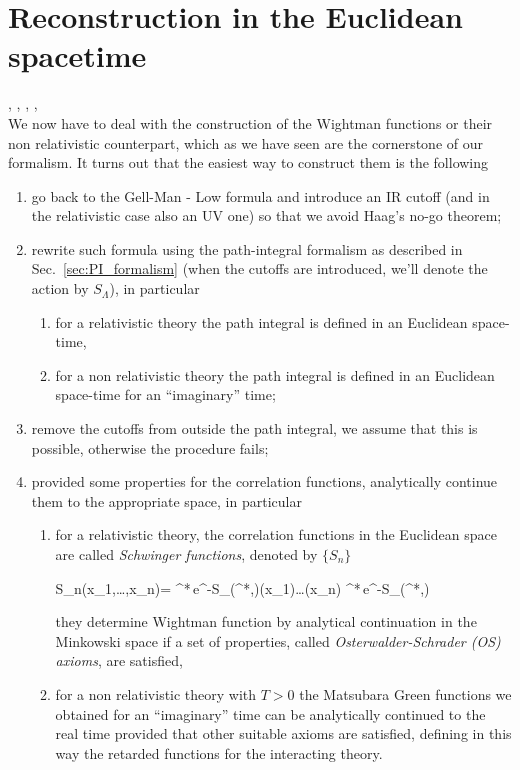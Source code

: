 \documentclass[../main/main.tex]{subfiles}
\begin{document}

\chapter{Reconstruction in the Euclidean spacetime}

\cite[Pages 185-191]{Streater:2000}, \cite{Summers:2016}, \cite{Wightman:1976}, \cite[Section 5.1]{Strocchi_2013}, \cite[Section 6.1, Chapter 19]{Glimm:1987}\\

We now have to deal with the construction of the Wightman functions or their non relativistic counterpart, which as we have seen are the cornerstone of our formalism. It turns out that the easiest way to construct them is the following
\begin{enumerate}[label=(\arabic*)]
	\item go back to the Gell-Man - Low formula and introduce an IR cutoff (and in the relativistic case also an UV one) so that we avoid Haag's no-go theorem;
	\item rewrite such formula using the path-integral formalism as described in Sec.~\ref{sec:PI_formalism} (when the cutoffs are introduced, we'll denote the action by $S_\Lambda$), in particular
	\begin{enumerate}[label=(\alph*)]
		\item for a relativistic theory the path integral is defined in an Euclidean space-time,
		\item for a non relativistic theory the path integral is defined in an Euclidean space-time for an ``imaginary'' time;
	\end{enumerate}
	\item remove the cutoffs from outside the path integral, we assume that this is possible, otherwise the procedure fails;
	\item provided some properties for the correlation functions, analytically continue them to the appropriate space, in particular
	\begin{enumerate}[label=(\alph*)]
		\item for a relativistic theory, the correlation functions in the Euclidean space are called \emph{Schwinger functions}, denoted by $\{S_n\}$
		\begin{eq}
			S_n(x_1,\ldots,x_n)=\limcutrem \frac%
			{\int\pide\phi\pide\phi^*\,e^{-S_\Lambda(\phi^*,\phi)}\phi(x_1)\ldots\phi(x_n)}
			{\int\pide\phi\pide\phi^*\,e^{-S_\Lambda(\phi^*,\phi)}}
		\end{eq}
		they determine Wightman function by analytical continuation in the Minkowski space if a set of properties, called \emph{Osterwalder-Schrader (OS) axioms}, are satisfied,
		\item for a non relativistic theory with $T>0$ the Matsubara Green functions we obtained for an ``imaginary'' time can be analytically continued to the real time provided that other suitable axioms are satisfied, defining in this way the retarded functions for the interacting theory.
	\end{enumerate}
\end{enumerate}
\end{document}
